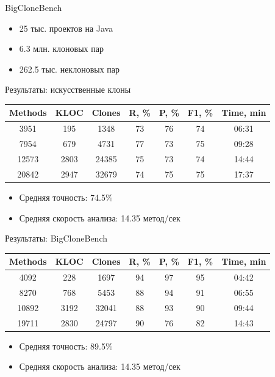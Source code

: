 \documentclass[russian,ignorenonframetext,]{beamer}
\providecommand{\tightlist}{%
  \setlength{\itemsep}{0pt}\setlength{\parskip}{0pt}}
\begin{document}
\begin{frame}{BigCloneBench}
\protect\hypertarget{bigclonebench}{}

\begin{itemize}
\tightlist
\item
  25 тыс. проектов на Java
\item
  6.3 млн. клоновых пар
\item
  262.5 тыс. неклоновых пар
\end{itemize}

\end{frame}

\begin{frame}{Результаты: искусственные клоны}
\protect\hypertarget{ux440ux435ux437ux443ux43bux44cux442ux430ux442ux44b-ux438ux441ux43aux443ux441ux441ux442ux432ux435ux43dux43dux44bux435-ux43aux43bux43eux43dux44b}{}

\begin{longtable}[]{@{}ccccccc@{}}
\toprule
Methods & KLOC & Clones & R, \% & P, \% & F1, \% & Time,
min\tabularnewline
\midrule
\endhead
3951 & 195 & 1348 & 73 & 76 & 74 & 06:31\tabularnewline
7954 & 679 & 4731 & 77 & 73 & 75 & 09:28\tabularnewline
12573 & 2803 & 24385 & 75 & 73 & 74 & 14:44\tabularnewline
20842 & 2947 & 32679 & 74 & 75 & 75 & 17:37\tabularnewline
\bottomrule
\end{longtable}

\begin{itemize}
\tightlist
\item
  Средняя точность: 74.5\%
\item
  Средняя скорость анализа: 14.35 метод/сек
\end{itemize}

\end{frame}

\begin{frame}{Результаты: BigCloneBench}
\protect\hypertarget{ux440ux435ux437ux443ux43bux44cux442ux430ux442ux44b-bigclonebench}{}

\begin{longtable}[]{@{}ccccccc@{}}
\toprule
Methods & KLOC & Clones & R, \% & P, \% & F1, \% & Time,
min\tabularnewline
\midrule
\endhead
4092 & 228 & 1697 & 94 & 97 & 95 & 04:42\tabularnewline
8270 & 768 & 5453 & 88 & 94 & 91 & 06:55\tabularnewline
10892 & 3192 & 32041 & 88 & 93 & 90 & 09:44\tabularnewline
19711 & 2830 & 24797 & 90 & 76 & 82 & 14:43\tabularnewline
\bottomrule
\end{longtable}

\begin{itemize}
\tightlist
\item
  Средняя точность: 89.5\%
\item
  Средняя скорость анализа: 14.35 метод/сек
\end{itemize}

\end{frame}
\end{document}
